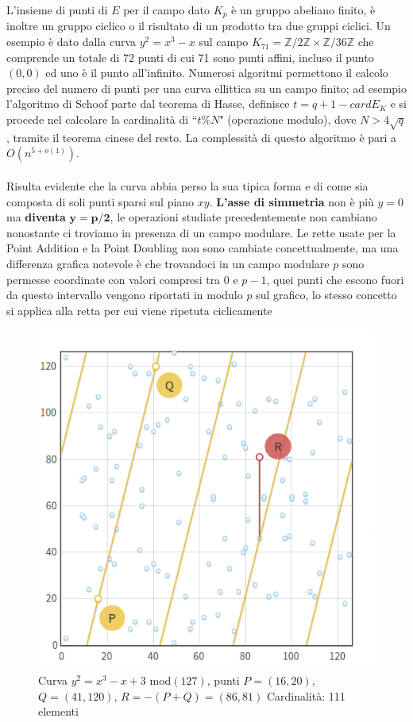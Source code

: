 \documentclass[a4paper,12pt]{tesiinfo}
\begin{document}
L'insieme di punti di $E$ per il campo dato $K_p$ \`e un gruppo abeliano finito, \`e inoltre un gruppo ciclico o il risultato di un prodotto tra due gruppi ciclici. Un esempio \`e dato dalla curva $y^2 = x^3 - x$ sul campo $K_{71} = \mathbb{Z}/2\mathbb{Z}\times\mathbb{Z}/36\mathbb{Z}$ che comprende un totale di 72 punti di cui 71 sono punti affini, incluso il punto $(0,0)$ ed uno \`e il punto all'infinito.
Numerosi algoritmi permettono il calcolo preciso del numero di punti per una curva ellittica su un campo finito; ad esempio l'algoritmo di Schoof parte dal teorema di Hasse, definisce $t = q+1-cardE_K$ e si procede nel calcolare la cardinalit\`a di ``$t\%N$" (operazione modulo), dove $N > 4\sqrt{q}$, tramite il teorema cinese del resto. La complessit\`a di questo algoritmo \`e pari a $O(n^{5+o(1)})$.
\\
%
\\
Risulta evidente che la curva abbia perso la sua tipica forma e di come sia composta di soli punti sparsi sul piano $xy$. 
\textbf{L'asse di simmetria} non \`e pi\`u $y=0$ ma \textbf{diventa} $\mathbold{y=p\big / 2}$, le operazioni studiate precedentemente non cambiano nonostante ci troviamo in presenza di un campo modulare. Le rette usate per la Point Addition e la Point Doubling non sono cambiate concettualmente, ma una differenza grafica notevole \`e che trovandoci in un campo modulare $p$ sono permesse coordinate con valori compresi tra $0$ e $p-1$, quei punti che escono fuori da questo intervallo vengono riportati in modulo $p$ sul grafico, lo stesso concetto si applica alla retta per cui viene ripetuta ciclicamente
\begin{figure}[H]
    \includegraphics[width=.6\textwidth,center]{ECmodPA}
    \caption{Curva $y^2=x^3-x+3$ mod$(127)$, punti $P = (16, 20)$, $Q=(41, 120)$, $R = -(P+Q) = (86, 81)$ Cardinalit\`a: 111 elementi}
\end{figure}
\end{document}
